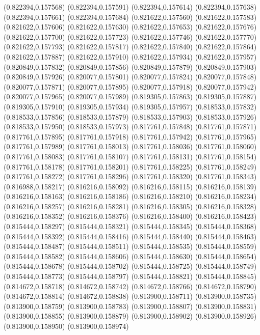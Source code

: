 (0.822394,0.157568)
(0.822394,0.157591)
(0.822394,0.157614)
(0.822394,0.157638)
(0.822394,0.157661)
(0.822394,0.157684)
(0.821622,0.157560)
(0.821622,0.157583)
(0.821622,0.157606)
(0.821622,0.157630)
(0.821622,0.157653)
(0.821622,0.157676)
(0.821622,0.157700)
(0.821622,0.157723)
(0.821622,0.157746)
(0.821622,0.157770)
(0.821622,0.157793)
(0.821622,0.157817)
(0.821622,0.157840)
(0.821622,0.157864)
(0.821622,0.157887)
(0.821622,0.157910)
(0.821622,0.157934)
(0.821622,0.157957)
(0.820849,0.157832)
(0.820849,0.157856)
(0.820849,0.157879)
(0.820849,0.157903)
(0.820849,0.157926)
(0.820077,0.157801)
(0.820077,0.157824)
(0.820077,0.157848)
(0.820077,0.157871)
(0.820077,0.157895)
(0.820077,0.157918)
(0.820077,0.157942)
(0.820077,0.157965)
(0.820077,0.157989)
(0.819305,0.157863)
(0.819305,0.157887)
(0.819305,0.157910)
(0.819305,0.157934)
(0.819305,0.157957)
(0.818533,0.157832)
(0.818533,0.157856)
(0.818533,0.157879)
(0.818533,0.157903)
(0.818533,0.157926)
(0.818533,0.157950)
(0.818533,0.157973)
(0.817761,0.157848)
(0.817761,0.157871)
(0.817761,0.157895)
(0.817761,0.157918)
(0.817761,0.157942)
(0.817761,0.157965)
(0.817761,0.157989)
(0.817761,0.158013)
(0.817761,0.158036)
(0.817761,0.158060)
(0.817761,0.158083)
(0.817761,0.158107)
(0.817761,0.158131)
(0.817761,0.158154)
(0.817761,0.158178)
(0.817761,0.158201)
(0.817761,0.158225)
(0.817761,0.158249)
(0.817761,0.158272)
(0.817761,0.158296)
(0.817761,0.158320)
(0.817761,0.158343)
(0.816988,0.158217)
(0.816216,0.158092)
(0.816216,0.158115)
(0.816216,0.158139)
(0.816216,0.158163)
(0.816216,0.158186)
(0.816216,0.158210)
(0.816216,0.158234)
(0.816216,0.158257)
(0.816216,0.158281)
(0.816216,0.158305)
(0.816216,0.158328)
(0.816216,0.158352)
(0.816216,0.158376)
(0.816216,0.158400)
(0.816216,0.158423)
(0.815444,0.158297)
(0.815444,0.158321)
(0.815444,0.158345)
(0.815444,0.158368)
(0.815444,0.158392)
(0.815444,0.158416)
(0.815444,0.158440)
(0.815444,0.158463)
(0.815444,0.158487)
(0.815444,0.158511)
(0.815444,0.158535)
(0.815444,0.158559)
(0.815444,0.158582)
(0.815444,0.158606)
(0.815444,0.158630)
(0.815444,0.158654)
(0.815444,0.158678)
(0.815444,0.158702)
(0.815444,0.158725)
(0.815444,0.158749)
(0.815444,0.158773)
(0.815444,0.158797)
(0.815444,0.158821)
(0.815444,0.158845)
(0.814672,0.158718)
(0.814672,0.158742)
(0.814672,0.158766)
(0.814672,0.158790)
(0.814672,0.158814)
(0.814672,0.158838)
(0.813900,0.158711)
(0.813900,0.158735)
(0.813900,0.158759)
(0.813900,0.158783)
(0.813900,0.158807)
(0.813900,0.158831)
(0.813900,0.158855)
(0.813900,0.158879)
(0.813900,0.158902)
(0.813900,0.158926)
(0.813900,0.158950)
(0.813900,0.158974)
